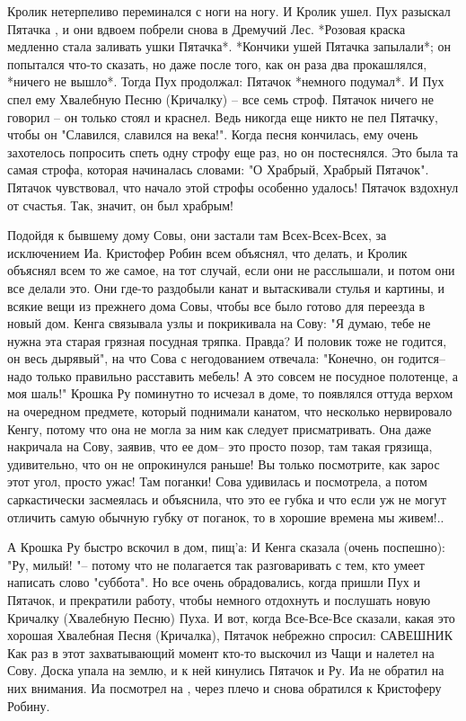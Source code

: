 Кролик нетерпеливо переминался с ноги на ногу.  И Кролик ушел.  Пух разыскал Пятачка , и они вдвоем побрели снова в Дремучий Лес.  *Розовая краска медленно стала заливать ушки Пятачка*.  *Кончики ушей Пятачка запылали*; он попытался что-то сказать, но даже после того, как он раза два прокашлялся, *ничего не вышло*.  Тогда Пух продолжал: Пятачок *немного подумал*.  И Пух спел ему Хвалебную Песню (Кричалку) -- все семь строф.  Пятачок ничего не говорил -- он только стоял и краснел.  Ведь никогда еще никто не пел Пятачку, чтобы он "Славился, славился на века!".  Когда песня кончилась, ему очень захотелось попросить спеть одну строфу еще раз, но он постеснялся.  Это была та самая строфа, которая начиналась словами: "О Храбрый, Храбрый Пятачок".  Пятачок чувствовал, что начало этой строфы особенно удалось! Пятачок вздохнул от счастья.  Так, значит, он был храбрым! 

Подойдя к бывшему дому Совы, они застали там Всех-Всех-Всех, за исключением Иа. Кристофер Робин всем объяснял, что делать, и Кролик объяснял всем то же самое, на тот случай, если они не расслышали, и потом они все делали это. Они где-то раздобыли канат и вытаскивали стулья и картины, и всякие вещи из прежнего дома Совы, чтобы все было готово для переезда в новый дом. Кенга связывала узлы и покрикивала на Сову: "Я думаю, тебе не нужна эта старая грязная посудная тряпка. Правда? И половик тоже не годится, он весь дырявый", на что Сова с негодованием отвечала: "Конечно, он годится-- надо только правильно расставить мебель! А это совсем не посудное полотенце, а моя шаль!" Крошка Ру поминутно то исчезал в доме, то появлялся оттуда верхом на очередном предмете, который поднимали канатом, что несколько нервировало Кенгу, потому что она не могла за ним как следует присматривать. Она даже накричала на Сову, заявив, что ее дом-- это просто позор, там такая грязища, удивительно, что он не опрокинулся раньше! Вы только посмотрите, как зарос этот угол, просто ужас! Там поганки! Сова удивилась и посмотрела, а потом саркастически засмеялась и объяснила, что это ее губка и что если уж не могут отличить самую обычную губку от поганок, то в хорошие времена мы живем!.. 

А Крошка Ру быстро вскочил в дом, пищ'а: И Кенга сказала (очень поспешно): "Ру, милый! "-- потому что не полагается так разговаривать с тем, кто умеет написать слово "суббота".  Но все очень обрадовались, когда пришли Пух и Пятачок, и прекратили работу, чтобы немного отдохнуть и послушать новую Кричалку (Хвалебную Песню) Пуха.  И вот, когда Все-Все-Все сказали, какая это хорошая Хвалебная Песня (Кричалка), Пятачок небрежно спросил: САВЕШНИК Как раз в этот захватывающий момент кто-то выскочил из Чащи и налетел на Сову.  Доска упала на землю, и к ней кинулись Пятачок и Ру.  Иа не обратил на них внимания.  Иа посмотрел на , через плечо и снова обратился к Кристоферу Робину.